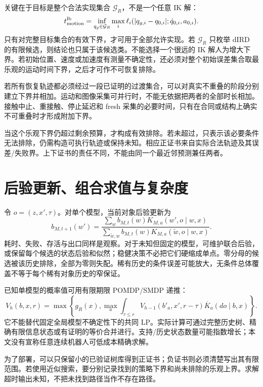 \documentclass[11pt,a4paper,fontset=fandol]{ctexart}
\theoremstyle{definition}
\theoremstyle{remark}\newtheorem{remark}[theorem]{说明}
\numberwithin{equation}{section}
\begin{document}
关键在于目标是整个合法实现集合 $\mathcal G_R$，不是一个任意 IK 解：
\begin{equation}
 t_{\rm motion}^{\rm lb}
 =\inf_{q_g\in\mathcal G_R}\max_i
 \ell_i(|q_{g,i}-q_{0,i}|;\dot q_{0,i},a_{0,i}).
 \label{eq:motion_lb}
\end{equation}
只有对完整目标集合的有效下界，才可用于全部允许实现。若 $\mathcal G_R$ 只枚举 dIRD 的有限候选，则结论也只属于该候选类。不能选择一个很远的 IK 解人为增大下界。若初始位置、速度或加速度有测量不确定性，还必须对整个初始误差集合取最乐观的运动时间下界，之后才可作不可恢复排除。

若所有恢复轨迹都必须经过一段已证明的过渡集合，可以对真实不重叠的阶段分别建立下界并相加。运动和图像采集可并行时，不能无依据把两者的全部时长相加。接触中止、重接触、停止延迟和 fresh 采集的必要时间，只有在合同或结构上确实不可重叠时才形成附加下界。

当这个乐观下界仍超过剩余预算，才构成有效排除。若未超过，只表示该必要条件无法排除，仍需构造可执行轨迹或保持未知。相应正证书来自实际合法轨迹及其误差/失败界。上下证书的责任不同，不能由同一个最近邻预测兼任两者。

\section{后验更新、组合求值与复杂度}
\label{app:compute}
令 $o=(z,x',\tau)$。对单个模型，当前对象后验更新为
\begin{equation}
 b_{M,t+1}(w')=
 \frac{\sum_w b_{M,t}(w)K_{M,a}(w',o\mid w,x)}
 {\sum_{\widetilde w,w}b_{M,t}(w)K_{M,a}(\widetilde w,o\mid w,x)}.
\end{equation}
耗时、失败、存活与出口同样是观察。对于未知但固定的模型，可维护联合后验，或保留每个候选的状态后验和似然；稳健决策不必把它们硬缩成单点。零分母的候选被该历史排除，全部为零则失配。稀有历史的条件误差可能放大，无条件总体覆盖不等于每个稀有对象历史的窄保证。

已知单模型的概率值可用有限期限 POMDP/SMDP 递推：
\begin{equation}
 V_h(b,x,r)=\max\left\{g_R(x),
 \max_a\int_{\tau\le r}V_{h-1}(b'_a,x',r-\tau)
 \overline K_a(do\mid b,x)\right\}.
\end{equation}
它不能替代固定全局模型不确定性下的共同 LP。实际计算可通过完整历史树、精确有限信息状态或有证明的等价合并进行。支持/历史状态数量可能指数增长；本文没有宣称任意连续机器人可低成本精确求解。

为了部署，可以只保留小的已验证树库得到正证书；负证书则必须清楚写出其有限范围。若使用近似搜索，要分别记录找到的策略下界和尚未排除的乐观上界。求解超时输出未知，不把未找到路径当作不存在路径。
\end{document}
